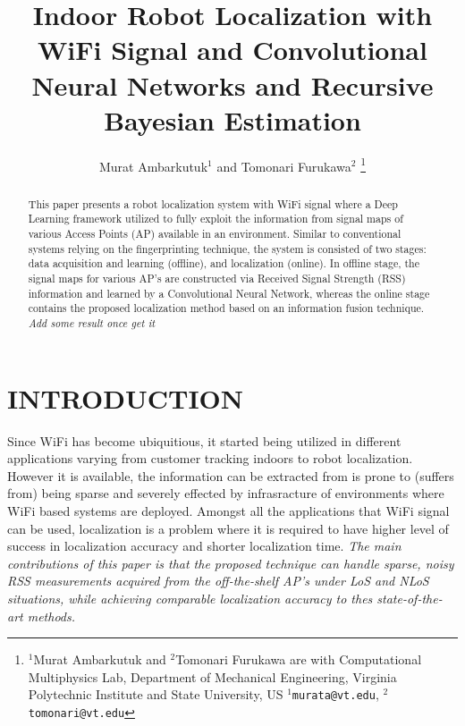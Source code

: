 \documentclass[letterpaper, 10 pt, conference]{ieeeconf}  %
\title{\LARGE \bf
Indoor Robot Localization with WiFi Signal and Convolutional Neural Networks and Recursive Bayesian Estimation
}
\author{Murat Ambarkutuk$^{1}$ and Tomonari Furukawa$^{2}$%
\thanks{$^{1}$Murat Ambarkutuk and $^{2}$Tomonari Furukawa are with Computational Multiphysics Lab, Department of Mechanical Engineering,
        Virginia Polytechnic Institute and State University, US
        {\tt\small $^{1}$murata@vt.edu}, {\tt\small $^{2}$tomonari@vt.edu}}%
}
\begin{document}
\maketitle
\thispagestyle{empty}
\pagestyle{empty}


\begin{abstract}

  This paper presents a robot localization system with WiFi signal where a Deep Learning framework utilized to fully exploit the information from signal maps of various Access Points (AP) available in an environment.
  Similar to conventional systems relying on the fingerprinting technique, the system is consisted of two stages: data acquisition and learning (offline), and localization (online).
  In offline stage, the signal maps for various AP's are constructed via Received Signal Strength (RSS) information and learned by a Convolutional Neural Network, whereas the online stage contains the proposed localization method based on an information fusion technique.
  \textit{Add some result once get it}
\end{abstract}


\section{INTRODUCTION}

  Since WiFi has become ubiquitious, it started being utilized in different applications varying from customer tracking indoors to robot localization. %
  However it is available, the information can be extracted from is prone to (suffers from) being sparse and severely effected by infrasracture of environments where WiFi based systems are deployed.
  Amongst all the applications that WiFi signal can be used, localization is a problem where it is required to have higher level of success in localization accuracy and shorter localization time.
  \textit{The main contributions of this paper is that the proposed technique can handle sparse, noisy RSS measurements acquired from the off-the-shelf AP's under LoS and NLoS situations, while achieving comparable localization accuracy to thes state-of-the-art methods.}
\end{document}
